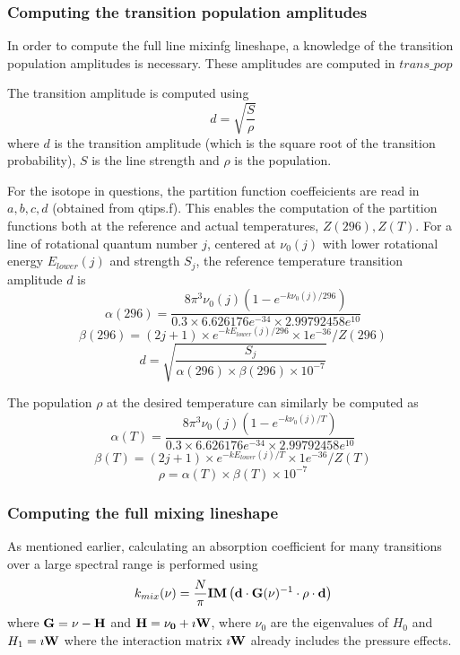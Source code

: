 \documentclass[11pt]{article}
\begin{document}
\subsubsection{Computing the transition population amplitudes}
In order to compute the full line mixinfg lineshape, a knowledge of the
transition population amplitudes is necessary. These amplitudes are computed
in $trans\_pop$

The transition amplitude is computed using 
\[
d = \sqrt{\frac{S}{\rho}}
\]
where $d$ is the transition amplitude (which is the square root of the
transition probability), $S$ is the line strength and $\rho$ is the 
population.

For the isotope in questions, the partition function coeffeicients are
read in $a,b,c,d$ (obtained from qtips.f). This enables the computation of 
the partition functions both at the reference and actual temperatures,
$Z(296), Z(T)$. For a line of rotational quantum number $j$, centered 
at $\nu_{0}(j)$ with lower rotational energy $E_{lower}(j)$ and strength 
$S_{j}$, the reference temperature transition amplitude $d$ is
\[
\alpha(296) = \frac{8 \pi^{3} \nu_{0}(j) (1-e^{-k\nu_{0}(j)/296})}
                    {0.3 \times 6.626176e^{-34} \times 2.99792458e^{10}}
\]
\[
\beta(296) = (2j+1) \times e^{-k E_{lower}(j)/296} 
                     \times 1e^{-36}/Z(296)
\]
\[
d = \sqrt {\frac{S_{j}}
                    {\alpha(296) \times \beta(296) \times 10^{-7}}}
\]

The population $\rho$ at the desired temperature can similarly be computed 
as
\[
\alpha(T) = \frac{8 \pi^{3} \nu_{0}(j) (1-e^{-k\nu_{0}(j)/T})}
                    {0.3 \times 6.626176e^{-34} \times 2.99792458e^{10}}
\]
\[
\beta(T) = (2j+1) \times e^{-k E_{lower}(j)/T} 
                     \times 1e^{-36}/Z(T)
\]
\[
\rho = \alpha(T) \times \beta(T) \times 10^{-7}
\]

\subsubsection{Computing the full mixing lineshape}
As mentioned earlier, calculating an absorption coefficient for many 
transitions over a large spectral range is performed using 
\[
k_{mix}(\nu)=\frac{N}{\pi} {\bf IM} \left({\bf d}\cdot{\bf G}({
\bf
  \nu})^{-1} \cdot{\bf \rho}\cdot{\bf d}\right)
\]
where ${\bf G}={\bf \nu}-{\bf H}$ and 
${\bf H}={\bf \nu_{0}}+\imath {\bf W}$, where $\nu_{0}$ are the 
eigenvalues of $H_{0}$ and $H_{1} = \imath {\bf W}$ where the interaction
matrix $\imath {\bf W}$ already includes the pressure effects.
 
\end{document}
